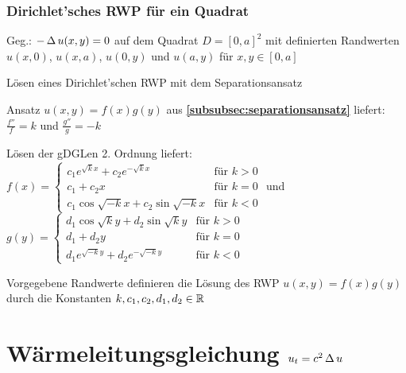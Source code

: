 \documentclass[german,color,5pt]{latex4ei/latex4ei_fs}
\begin{document}
\begin{sectionbox}
	\subsubsection{Dirichlet'sches RWP für ein Quadrat}
	Geg.: $-\operatorname{\Delta} u(x,y)=0$ auf dem Quadrat $D=[0,a]^2$ mit definierten Randwerten $u(x,0)$, $u(x,a)$, $u(0,y)$ und $u(a,y)$ für $x,y\in [0,a]$
	\begin{cookbox}{Lösen eines Dirichlet'schen RWP mit dem Separationsansatz}
		\item Ansatz $u(x,y)=f(x)g(y)$ aus {\bf\ref{subsubsec:separationsansatz}} liefert: $\frac{f''}{f}=k$ und $\frac{g''}{g}=-k$
		\item Lösen der gDGLen 2. Ordnung liefert:\\
		$f(x)=\begin{cases}
		c_1e^{\sqrt{k}x}+c_2e^{-\sqrt{k}x} & \text{für } k>0\\
		c_1+c_2x & \text{für }  k=0\\
		c_1\cos\sqrt{-k}x+c_2\sin\sqrt{-k}x & \text{für } k<0
		\end{cases}$ \qquad und \\
		$g(y)=\begin{cases}
		d_1\cos\sqrt{k}y+d_2\sin\sqrt{k}y & \text{für } k>0\\
		d_1+d_2y & \text{für }  k=0\\
		d_1e^{\sqrt{-k}y}+d_2e^{-\sqrt{-k}y} & \text{für } k<0
		\end{cases}$
		\item Vorgegebene Randwerte definieren die Lösung des RWP $u(x,y)=f(x)g(y)$ durch die Konstanten $k,c_1,c_2,d_1,d_2\in\operatorname{\mathbb R}$
	\end{cookbox}
\end{sectionbox}

\section{Wärmeleitungsgleichung \quad \(u_{t}=c^{2} \operatorname{\Delta}{u}\)}
\end{document}
